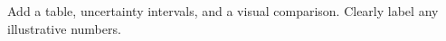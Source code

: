 Add a table, uncertainty intervals, and a visual comparison. Clearly label any illustrative numbers.
